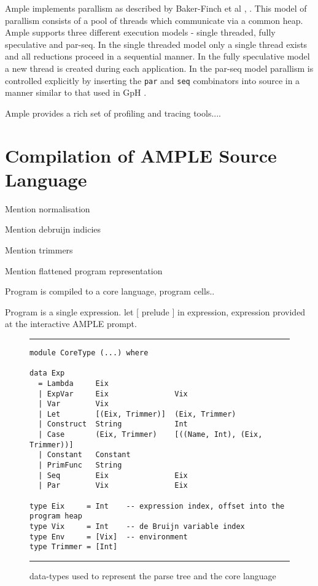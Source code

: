 \documentclass{llncs}
\begin{document}
Ample implements parallism as described by Baker-Finch et al \cite{baker-finch:osple}, \cite{baker-finch:plam}. This model of parallism consists of a pool of threads which communicate via a common heap. Ample supports three different execution models - single threaded, fully speculative and par-seq. In the single threaded model only a single thread exists and all reductions proceed in a sequential manner. In the fully speculative model a new thread is created during each application. In the par-seq model parallism is controlled explicitly by inserting the \texttt{par} and \texttt{seq} combinators into source in a manner similar to that used in GpH \cite{GpH}.

Ample provides a rich set of profiling and tracing tools....


\section{Compilation of AMPLE Source Language}

Mention normalisation

Mention debruijn indicies

Mention trimmers

Mention flattened program representation

Program is compiled to a core language, program cells.. 

Program is a single expression. let [ prelude ] in expression, expression provided at the interactive AMPLE prompt.


\begin{figure}

\hrule
\begin{verbatim}
module CoreType (...) where

data Exp
  = Lambda     Eix
  | ExpVar     Eix               Vix
  | Var        Vix
  | Let        [(Eix, Trimmer)]  (Eix, Trimmer)
  | Construct  String            Int
  | Case       (Eix, Trimmer)    [((Name, Int), (Eix, Trimmer))]
  | Constant   Constant
  | PrimFunc   String
  | Seq        Eix               Eix
  | Par        Vix               Eix

type Eix     = Int    -- expression index, offset into the program heap
type Vix     = Int    -- de Bruijn variable index
type Env     = [Vix]  -- environment
type Trimmer = [Int]
\end{verbatim}
\hrule
\caption{data-types used to represent the parse tree and the core language}
\label{figExp}
\end{figure}
\end{document}

